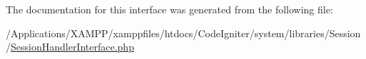 The documentation for this interface was generated from the following file\+:\begin{DoxyCompactItemize}
\item 
/\+Applications/\+X\+A\+M\+P\+P/xamppfiles/htdocs/\+Code\+Igniter/system/libraries/\+Session/\mbox{\hyperlink{_session_handler_interface_8php}{Session\+Handler\+Interface.\+php}}\end{DoxyCompactItemize}
